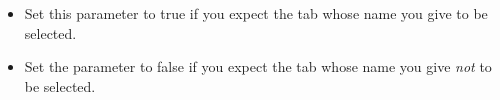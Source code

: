 \begin{itemize}
\item Set this parameter to true if you expect the tab whose name you give to be selected.
\item Set the parameter to false if you expect the tab whose name you give \emph{not} to be selected. 
\end{itemize}

    